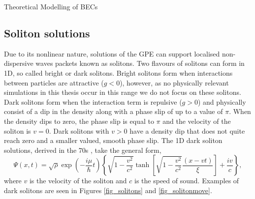 \begin{chapter}{\label{cha:theoretical_model}Theoretical Modelling of BECs}
	\subsection{\label{section:soliton} Soliton solutions}
	Due to its nonlinear nature, solutions of the GPE can support localised non-dispersive waves packets known as solitons. Two flavours of solitons can form in 1D, so called bright or dark solitons. Bright solitons form when interactions between particles are attractive ($g<0$), however, as no physically relevant simulations in this thesis occur in this range we do not focus on these solitons. Dark solitons form when the interaction term is repulsive ($g>0$) and physically consist of a dip in the density along with a phase slip of up to a value of $\pi$. When the density dips to zero, the phase slip is equal to $\pi$ and the velocity of the soliton is $v=0$. Dark solitons with $v>0$ have a density dip that does not quite reach zero and a smaller valued, smooth phase slip. The 1D dark soliton solutions, derived in the 70s \cite{zakharov72,zakharov73}, take the general form,
	\begin{equation}
		\Psi(x,t) = \sqrt{\rho}\exp\left(-\frac{i\mu}{\hbar}t\right)\left\{ \sqrt{1-\frac{v^2}{c^2}} \tanh\left[ \sqrt{1-\frac{v^2}{c^2}}\frac{(x-vt)}{\xi} \right ] + \frac{iv}{c}  \right \} ,
	\end{equation}
	where $v$ is the velocity of the soliton and $c$ is the speed of sound. Examples of dark solitons are seen in Figures \ref{fig_solitons} and \ref{fig_solitonmove}.
	\begin{figure}[!ht]
	\centering
\end{figure}
\end{chapter}
